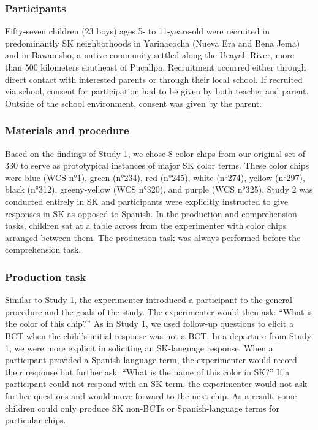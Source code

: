\documentclass[
  english,
  ,man,floatsintext]{apa6}
\begin{document}
\hypertarget{participants-1}{%
\subsubsection{Participants}\label{participants-1}}

Fifty-seven children (23 boys) ages 5- to 11-years-old were recruited in predominantly SK neighborhoods in Yarinacocha (Nueva Era and Bena Jema) and in Bawanisho, a native community settled along the Ucayali River, more than 500 kilometers southeast of Pucallpa. Recruitment occurred either through direct contact with interested parents or through their local school. If recruited via school, consent for participation had to be given by both teacher and parent. Outside of the school environment, consent was given by the parent.

\hypertarget{materials-and-procedure-1}{%
\subsubsection{Materials and procedure}\label{materials-and-procedure-1}}

Based on the findings of Study 1, we chose 8 color chips from our original set of 330 to serve as prototypical instances of major SK color terms. These color chips were blue (WCS n°1), green (n°234), red (n°245), white (n°274), yellow (n°297), black (n°312), greeny-yellow (WCS n°320), and purple (WCS n°325). Study 2 was conducted entirely in SK and participants were explicitly instructed to give responses in SK as opposed to Spanish. In the production and comprehension tasks, children sat at a table across from the experimenter with color chips arranged between them. The production task was always performed before the comprehension task.

\hypertarget{production-task}{%
\subsubsection{Production task}\label{production-task}}

Similar to Study 1, the experimenter introduced a participant to the general procedure and the goals of the study. The experimenter would then ask: \enquote{What is the color of this chip?} As in Study 1, we used follow-up questions to elicit a BCT when the child's initial response was not a BCT. In a departure from Study 1, we were more explicit in soliciting an SK-language response. When a participant provided a Spanish-language term, the experimenter would record their response but further ask: \enquote{What is the name of this color in SK?} If a participant could not respond with an SK term, the experimenter would not ask further questions and would move forward to the next chip. As a result, some children could only produce SK non-BCTs or Spanish-language terms for particular chips.
\end{document}
